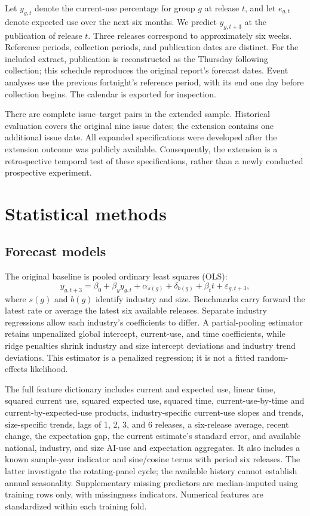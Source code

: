 \documentclass[11pt]{article}
\begin{document}
Let $y_{g,t}$ denote the current-use percentage for group $g$ at release $t$, and let $e_{g,t}$ denote expected use over the next six months. We predict $y_{g,t+3}$ at the publication of release $t$. Three releases correspond to approximately six weeks. Reference periods, collection periods, and publication dates are distinct. For the included extract, publication is reconstructed as the Thursday following collection; this schedule reproduces the original report's forecast dates. Event analyses use the previous fortnight's reference period, with its end one day before collection begins. The calendar is exported for inspection.

There are \PairN{} complete issue--target pairs in the extended sample. Historical evaluation covers the original nine issue dates; the extension contains one additional issue date. All expanded specifications were developed after the extension outcome was publicly available. Consequently, the extension is a retrospective temporal test of these specifications, rather than a newly conducted prospective experiment.

\section{Statistical methods}
\subsection{Forecast models}
The original baseline is pooled ordinary least squares (OLS):
\begin{equation}
 y_{g,t+3}=\beta_0+\beta_y y_{g,t}+\alpha_{s(g)}+\delta_{b(g)}+\beta_t t+\varepsilon_{g,t+3},
\end{equation}
where $s(g)$ and $b(g)$ identify industry and size. Benchmarks carry forward the latest rate or average the latest six available releases. Separate industry regressions allow each industry's coefficients to differ. A partial-pooling estimator retains unpenalized global intercept, current-use, and time coefficients, while ridge penalties shrink industry and size intercept deviations and industry trend deviations. This estimator is a penalized regression; it is not a fitted random-effects likelihood.

The full feature dictionary includes current and expected use, linear time, squared current use, squared expected use, squared time, current-use-by-time and current-by-expected-use products, industry-specific current-use slopes and trends, size-specific trends, lags of 1, 2, 3, and 6 releases, a six-release average, recent change, the expectation gap, the current estimate's standard error, and available national, industry, and size AI-use and expectation aggregates. It also includes a known sample-year indicator and sine/cosine terms with period six releases. The latter investigate the rotating-panel cycle; the available history cannot establish annual seasonality. Supplementary missing predictors are median-imputed using training rows only, with missingness indicators. Numerical features are standardized within each training fold.
\end{document}

